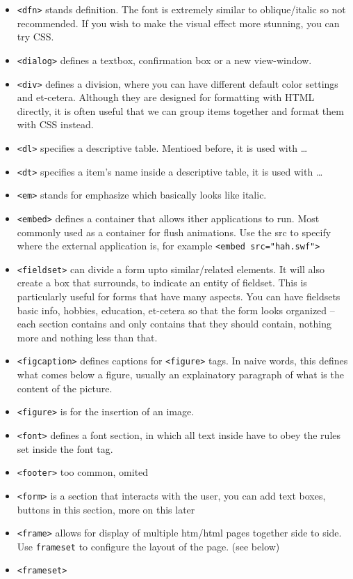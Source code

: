 \documentclass[oneside, 12pt]{article}
\newcommand{\itemm}[1]{\item \texttt{#1}}
\begin{document}
\begin{itemize}
	\itemm{<dfn>} stands definition. The font is extremely similar to oblique/italic so not recommended.
	If you wish to make the visual effect more stunning, you can try CSS.
	\itemm{<dialog>} defines a textbox, confirmation box or a new view-window. 
	\itemm{<div>} defines a division, where you can have different default color settings and et-cetera. 
	Although they are designed for formatting with HTML directly, it is often useful that we can group
	items together and format them with CSS instead.
	\itemm{<dl>} specifies a descriptive table. Mentioed before, it is used with \ldots
	\itemm{<dt>} specifies a item's name  inside a descriptive table, it is used with \ldots
	\itemm{<em>} stands for emphasize which basically looks like italic.
	\itemm{<embed>} defines a container that allows ither applications to run. Most commonly used as
	a container for flush animations. Use the src to specify where the external application is, for example
	\texttt{<embed src="hah.swf">}
	\itemm{<fieldset>} can divide a form upto similar/related elements. It will also create a box that
	surrounds, to indicate an entity of fieldset. This is particularly useful for forms that have many
	aspects. You can have fieldsets basic info, hobbies, education, et-cetera so that the form looks
	organized -- each section contains and only contains that they should contain, nothing more and 
	nothing less than that.
	\itemm{<figcaption>} defines captions for \texttt{<figure>} tags. In naive words, this defines
	what comes below a figure, usually an explainatory paragraph of what is the content of the picture.
	\itemm{<figure>} is for the insertion of an image.
	\itemm{<font>} defines a font section, in which all text inside have to obey the rules set inside
	the font tag.
	\itemm{<footer>} too common, omited
	\itemm{<form>} is a section that interacts with the user, you can add text boxes, buttons in this 
	section, more on this later
	\itemm{<frame>} allows for display of multiple htm/html pages together side to side. Use \texttt{frameset}
	to configure the layout of the page. (see below)
	\itemm{<frameset>} 
\end{itemize}
\end{document}
